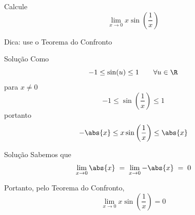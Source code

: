 \begin{question}
  Calcule
  \[
    \lim_{x \to 0} x\sin\left(\frac{1}{x}\right)
  \]

  \bigskip
  Dica: use o Teorema do Confronto
\end{question}

\begin{resolution}{Solução}
  Como
  \[
    -1 \leq \sin(u) \leq 1 \qquad \forall u \in \R
  \]
  para $x\neq 0$
  \[
    -1 \leq \sin\left(\frac{1}{x}\right) \leq 1
  \]
  portanto
  \[
    -\abs{x} \leq x\sin\left(\frac{1}{x}\right) \leq \abs{x}
  \]
\end{resolution}

\begin{resolution}{Solução}
  Sabemos que
  \[
    \lim_{x\to 0} \abs{x}
    \;=\; \lim_{x\to 0} -\abs{x}
    \;=\; 0
  \]

  Portanto, pelo Teorema do Confronto,
  \[
    \lim_{x \to 0} x\sin\left(\frac{1}{x}\right) = 0
  \]
\end{resolution}

